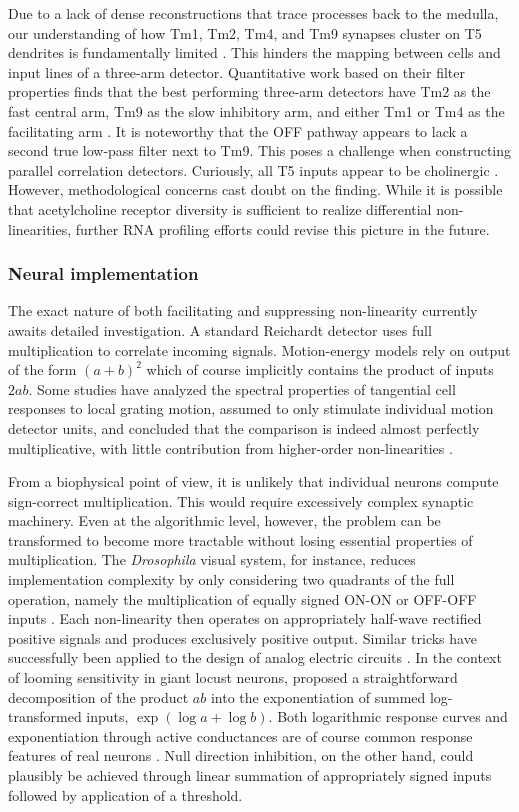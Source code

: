 Due to a lack of dense reconstructions that trace processes back to the medulla, our understanding of how Tm1, Tm2, Tm4, and Tm9 synapses cluster on T5 dendrites is fundamentally limited \citep{Shinomiya:2014dx}. This hinders the mapping between cells and input lines of a three-arm detector. Quantitative work based on their filter properties finds that the best performing three-arm detectors have Tm2 as the fast central arm, Tm9 as the slow inhibitory arm, and either Tm1 or Tm4 as the facilitating arm \citep{Arenz:2017aa}. It is noteworthy that the OFF pathway appears to lack a second true low-pass filter next to Tm9. This poses a challenge when constructing parallel correlation detectors. Curiously, all T5 inputs appear to be cholinergic \citep{Shinomiya:2014dx}. However, methodological concerns cast doubt on the finding. While it is possible that acetylcholine receptor diversity is sufficient to realize differential non-linearities, further RNA profiling efforts could revise this picture in the future.

\subsubsection{Neural implementation}
The exact nature of both facilitating and suppressing non-linearity currently awaits detailed investigation. A standard Reichardt detector uses full multiplication to correlate incoming signals. Motion-energy models rely on output of the form $(a+b)^2$ which of course implicitly contains the product of inputs $2ab$. Some studies have analyzed the spectral properties of tangential cell responses to local grating motion, assumed to only stimulate individual motion detector units, and concluded that the comparison is indeed almost perfectly multiplicative, with little contribution from higher-order non-linearities \citep{Egelhaaf:1989wf}.

From a biophysical point of view, it is unlikely that individual neurons compute sign-correct multiplication. This would require excessively complex synaptic machinery. Even at the algorithmic level, however, the problem can be transformed to become more tractable without losing essential properties of multiplication. The \textit{Drosophila} visual system, for instance, reduces implementation complexity by only considering two quadrants of the full operation, namely the multiplication of equally signed ON-ON or OFF-OFF inputs \citep{Eichner:2011ic}. Each non-linearity then operates on appropriately half-wave rectified positive signals and produces exclusively positive output. Similar tricks have successfully been applied to the design of analog electric circuits \citep{Mead:1989aa}. In the context of looming sensitivity in giant locust neurons, \citet{Gabbiani:2002kb} proposed a straightforward decomposition of the product $ab$ into the exponentiation of summed log-transformed inputs, $\exp(\log a + \log b)$. Both logarithmic response curves and exponentiation through active conductances are of course common response features of real neurons \citep{Koch:2004aa}. Null direction inhibition, on the other hand, could plausibly be achieved through linear summation of appropriately signed inputs followed by application of a threshold.


